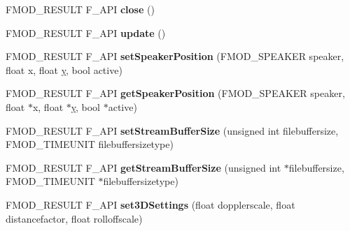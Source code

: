 \begin{DoxyCompactItemize}
\item 
\hypertarget{class_f_m_o_d_1_1_system_af8b6c4c677e44197657893de01383169}{F\+M\+O\+D\+\_\+\+R\+E\+S\+U\+L\+T F\+\_\+\+A\+P\+I {\bfseries close} ()}\label{class_f_m_o_d_1_1_system_af8b6c4c677e44197657893de01383169}

\item 
\hypertarget{class_f_m_o_d_1_1_system_a52538b2fe55918c1575ff22bbfab48d6}{F\+M\+O\+D\+\_\+\+R\+E\+S\+U\+L\+T F\+\_\+\+A\+P\+I {\bfseries update} ()}\label{class_f_m_o_d_1_1_system_a52538b2fe55918c1575ff22bbfab48d6}

\item 
\hypertarget{class_f_m_o_d_1_1_system_a0e814fbdc6a5a2aa2bbfbed56b461c53}{F\+M\+O\+D\+\_\+\+R\+E\+S\+U\+L\+T F\+\_\+\+A\+P\+I {\bfseries set\+Speaker\+Position} (F\+M\+O\+D\+\_\+\+S\+P\+E\+A\+K\+E\+R speaker, float x, float \hyperlink{_ice_utils_8h_aa7ffaed69623192258fb8679569ff9ba}{y}, bool active)}\label{class_f_m_o_d_1_1_system_a0e814fbdc6a5a2aa2bbfbed56b461c53}

\item 
\hypertarget{class_f_m_o_d_1_1_system_a931be005803ddbecb510eed93df39f10}{F\+M\+O\+D\+\_\+\+R\+E\+S\+U\+L\+T F\+\_\+\+A\+P\+I {\bfseries get\+Speaker\+Position} (F\+M\+O\+D\+\_\+\+S\+P\+E\+A\+K\+E\+R speaker, float $\ast$x, float $\ast$\hyperlink{_ice_utils_8h_aa7ffaed69623192258fb8679569ff9ba}{y}, bool $\ast$active)}\label{class_f_m_o_d_1_1_system_a931be005803ddbecb510eed93df39f10}

\item 
\hypertarget{class_f_m_o_d_1_1_system_a3a1af0fad360c049a38df4abcb14380c}{F\+M\+O\+D\+\_\+\+R\+E\+S\+U\+L\+T F\+\_\+\+A\+P\+I {\bfseries set\+Stream\+Buffer\+Size} (unsigned int filebuffersize, F\+M\+O\+D\+\_\+\+T\+I\+M\+E\+U\+N\+I\+T filebuffersizetype)}\label{class_f_m_o_d_1_1_system_a3a1af0fad360c049a38df4abcb14380c}

\item 
\hypertarget{class_f_m_o_d_1_1_system_a363f5ab0586dd5a10e091986fc2e6a3f}{F\+M\+O\+D\+\_\+\+R\+E\+S\+U\+L\+T F\+\_\+\+A\+P\+I {\bfseries get\+Stream\+Buffer\+Size} (unsigned int $\ast$filebuffersize, F\+M\+O\+D\+\_\+\+T\+I\+M\+E\+U\+N\+I\+T $\ast$filebuffersizetype)}\label{class_f_m_o_d_1_1_system_a363f5ab0586dd5a10e091986fc2e6a3f}

\item 
\hypertarget{class_f_m_o_d_1_1_system_a107414e588b619f0883570efa92da2ca}{F\+M\+O\+D\+\_\+\+R\+E\+S\+U\+L\+T F\+\_\+\+A\+P\+I {\bfseries set3\+D\+Settings} (float dopplerscale, float distancefactor, float rolloffscale)}\label{class_f_m_o_d_1_1_system_a107414e588b619f0883570efa92da2ca}


\end{DoxyCompactItemize}
